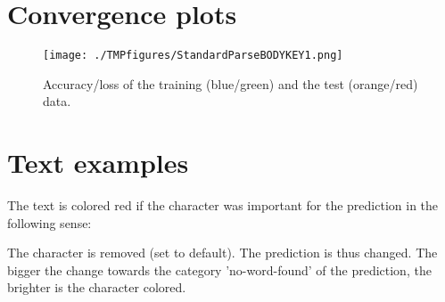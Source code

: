 \documentclass[a4paper,10pt,twoside]{article}
\begin{document}
        \section{Convergence plots}
\begin{figure}[H]
\begin{center}
\texttt{[image: ./TMPfigures/StandardParseBODYKEY1.png]}
\end{center}
\caption{Accuracy/loss of the training (blue/green) and the test (orange/red) data.}
\end{figure}
\section{Text examples}
The text is colored red if the character was important for the prediction in the following sense:


    The character is removed (set to default). The prediction is thus changed. 
    The bigger the change towards the category 'no-word-found' of the prediction, the brighter is the character colored. 
    \vspace{1cm}
    
\end{document}
